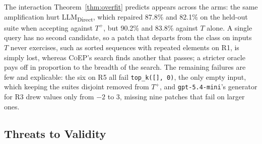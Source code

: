 \documentclass[acmsmall,screen,review,anonymous,nonacm]{acmart}
\newcommand{\tool}{\textsc{CoEP}\xspace}
\newcommand{\direct}{LLM\textsubscript{Direct}\xspace}
\newcommand{\gm}{\texttt{gpt-5.4-mini}\xspace}
\begin{document}
The interaction Theorem~\ref{thm:overfit} predicts appears across the arms: the same amplification hurt \direct, which repaired 87.8\% and 82.1\% on the held-out suite when accepting against $T^{+}$, but 90.2\% and 83.8\% against $T$ alone. A single query has no second candidate, so a patch that departs from the class on inputs $T$ never exercises, such as sorted sequences with repeated elements on R1, is simply lost, whereas \tool's search finds another that passes; a stricter oracle pays off in proportion to the breadth of the search. The remaining failures are few and explicable: the six on R5 all fail \texttt{top\_k([], 0)}, the only empty input, which keeping the suites disjoint removed from $T^{+}$, and \gm's generator for R3 drew values only from $-2$ to $3$, missing nine patches that fail on larger ones.

\subsection{Threats to Validity}
\label{sec:threats}
\end{document}

